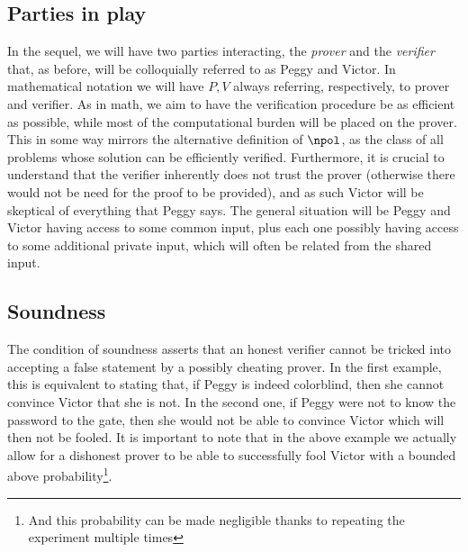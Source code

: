 \documentclass{article}
\begin{document}
\subsection{Parties in play}
In the sequel, we will have two parties interacting, the \textit{prover} and the \textit{verifier} that, as before, will be colloquially referred to as Peggy and Victor. In mathematical notation we will have $P, V$ always referring, respectively, to prover and verifier. As in math, we aim to have the verification procedure be as efficient as possible, while most of the computational burden will be placed on the prover. This in some way mirrors the alternative definition of $\npol$, as the class of all problems whose solution can be efficiently verified. Furthermore, it is crucial to understand that the verifier inherently does not trust the prover (otherwise there would not be need for the proof to be provided), and as such Victor will be skeptical of everything that Peggy says. The general situation will be Peggy and Victor having access to some common input, plus each one possibly having access to some additional private input, which will often be related from the shared input.

\subsection{Soundness}
The condition of soundness asserts that an honest verifier cannot be tricked into accepting a false statement by a possibly cheating prover. In the first example, this is equivalent to stating that, if Peggy is indeed colorblind, then she cannot convince Victor that she is not. In the second one, if Peggy were not to know the password to the gate, then she would not be able to convince Victor which will then not be fooled. It is important to note that in the above example we actually allow for a dishonest prover to be able to successfully fool Victor with a bounded above probability\footnote{And this probability can be made negligible thanks to repeating the experiment multiple times}.
\end{document}
